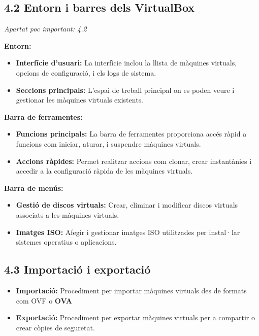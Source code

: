 \documentclass[
  12 pt,
  a4paper,
]{article}
\providecommand{\tightlist}{%
  \setlength{\itemsep}{0pt}\setlength{\parskip}{0pt}}
\begin{document}
\subsection{4.2 Entorn i barres dels
VirtualBox}\label{entorn-i-barres-dels-virtualbox}

\emph{Apartat poc important: 4.2}

\textbf{Entorn:}

\begin{itemize}
\tightlist
\item
  \textbf{Interfície d'usuari:} La interfície inclou la llista de
  màquines virtuals, opcions de configuració, i els logs de sistema.
\item
  \textbf{Seccions principals:} L'espai de treball principal on es poden
  veure i gestionar les màquines virtuals existents.
\end{itemize}

\textbf{Barra de ferramentes:}

\begin{itemize}
\tightlist
\item
  \textbf{Funcions principals:} La barra de ferramentes proporciona
  accés ràpid a funcions com iniciar, aturar, i suspendre màquines
  virtuals.
\item
  \textbf{Accions ràpides:} Permet realitzar accions com clonar, crear
  instantànies i accedir a la configuració ràpida de les màquines
  virtuals.
\end{itemize}

\textbf{Barra de menús:}

\begin{itemize}
\tightlist
\item
  \textbf{Gestió de discos virtuals:} Crear, eliminar i modificar discos
  virtuals associats a les màquines virtuals.
\item
  \textbf{Imatges ISO:} Afegir i gestionar imatges ISO utilitzades per
  instal·lar sistemes operatius o aplicacions.
\end{itemize}

\subsection{4.3 Importació i
exportació}\label{importaciuxf3-i-exportaciuxf3}

\begin{itemize}
\tightlist
\item
  \textbf{Importació:} Procediment per importar màquines virtuals des de
  formats com OVF o \textbf{OVA}
\item
  \textbf{Exportació:} Procediment per exportar màquines virtuals per a
  compartir o crear còpies de seguretat.
\end{itemize}
\end{document}

